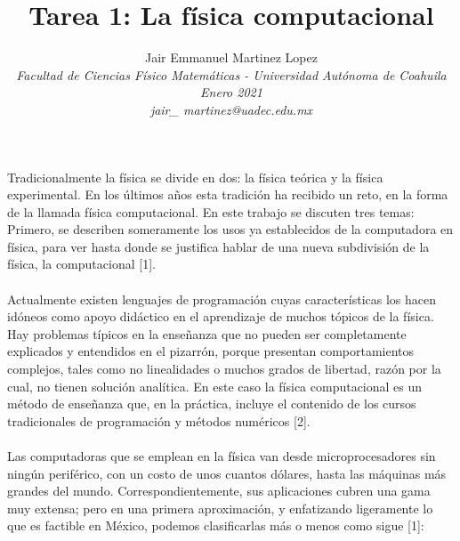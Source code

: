 \documentclass[12pt,a4paper]{article}
\title{\vspace{-10mm}\fontsize{14pt}{10pt}\textbf{Tarea 1: La física computacional}} %
\author{
\normalsize Jair Emmanuel Martinez Lopez\\ %
\textit{\normalsize Facultad de Ciencias Físico Matemáticas - Universidad Autónoma de Coahuila}\\ %
\textit{\normalsize Enero 2021}\\
\textit{\normalsize jair\_ martinez@uadec.edu.mx} %
\vspace{-5mm}
}
\date{}
\begin{document}
\maketitle
\thispagestyle{fancy}

Tradicionalmente la física se divide en dos: la física teórica y la física experimental. En los últimos años esta tradición ha recibido un reto, en la forma de la llamada física computacional. En este trabajo se discuten tres temas: Primero, se describen someramente los usos ya establecidos de la computadora en física, para ver hasta donde se justifica hablar de una nueva subdivisión de la física, la computacional [1].\\
\\
Actualmente existen lenguajes de programación cuyas características los hacen idóneos como apoyo didáctico en el aprendizaje de muchos tópicos de la física. Hay problemas típicos en la enseñanza que no pueden ser completamente explicados y entendidos en el pizarrón, porque presentan comportamientos complejos, tales como no linealidades o muchos grados de libertad, razón por la cual, no tienen solución analítica. En este caso la física computacional es un método de enseñanza que, en la práctica, incluye el contenido de los cursos tradicionales de programación y métodos numéricos [2].\\
\\
Las computadoras que se emplean en la física van desde microprocesadores sin ningún periférico, con un costo de unos cuantos dólares, hasta las máquinas más grandes del mundo. Correspondientemente, sus aplicaciones cubren una gama muy extensa; pero en una primera aproximación, y enfatizando ligeramente lo que es factible en México, podemos clasificarlas más o menos como sigue [1]:
\end{document}
